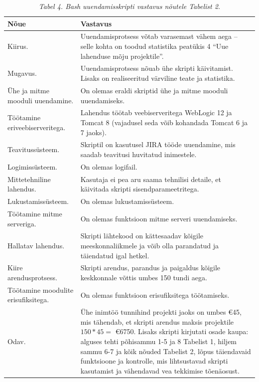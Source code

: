 \documentclass[12pt]{article}
\begin{document}
   \begin{table}[H]
    \caption*{\textit{Tabel 4. Bash uuendamisskripti vastavus nõutele Tabelist 2.}}
    
    \begin{tabular}{|p{3.5cm}|p{10.5cm}|}
      \hline
      \textbf{Nõue} & \textbf{Vastavus}\\
      \hline
      Kiirus. & Uuendamisprotsess võtab varasemast vähem aega \--- selle kohta on toodud statistika peatükis 4 ``Uue lahenduse mõju projektile''.\\
      \hline
      Mugavus. & Uuendamisprotsess nõuab ühe skripti käivitamist. Lisaks on realiseeritud värviline teate ja statistika.\\
      \hline
      Ühe ja mitme mooduli uuendamine. & On olemas eraldi skriptid ühe ja mitme mooduli uuendamiseks.\\
      \hline
      Töötamine eriveebiserveritega. & Lahendus töötab veebiserveritega WebLogic 12 ja Tomcat 8 (vajadusel seda võib kohandada Tomcat 6 ja 7 jaoks).\\
      \hline
      Teavitussüsteem. & Skriptil on kasutusel JIRA tööde uuendamine, mis saadab teavitusi huvitatud inimestele.\\
      \hline
      Logimissüsteem. & On olemas logifail.\\
      \hline
      Mittetehniline lahendus. & Kasutaja ei pea aru saama tehnilisi detaile, et käivitada skripti sisendparameetritega.\\
      \hline
      Lukustamissüsteem. & On olemas lukustamissüsteem.\\
      \hline
      Töötamine mitme serveriga. & On olemas funktsioon mitme serveri uuendamiseks.\\
      \hline
      Hallatav lahendus. & Skripti lähtekood on kättesaadav kõigile meeskonnaliikmele ja võib olla parandatud ja täiendatud igal hetkel.\\
      \hline
      Kiire arendusprotsess. & Skripti arendus, parandus ja paigaldus kõigile keskkonnale võttis umbes 150 tundi aega.\\
      \hline
      Töötamine moodulite erisufiksitega. & On olemas funktsioon erisufiksitega töötamiseks.\\
      \hline
      Odav. & Ühe inimtöö tunnihind projekti jaoks on umbes \euro 45, mis tähendab, et skripti arendus maksis projektile $150 * 45 = $ \euro 6750. Lisaks skripti kirjutati osade kaupa: alguses tehti põhisammu 1-5 ja 8 Tabelist 1, hiljem sammu 6-7 ja kõik nõuded Tabelist 2, lõpus täiendavaid funktsioone ja kontrolle, mis lihtsustavad skripti kasutamist ja vähendavad vea tekkimise tõenäosust.\\
      \hline
    \end{tabular}
  \end{table}
  
\end{document}
